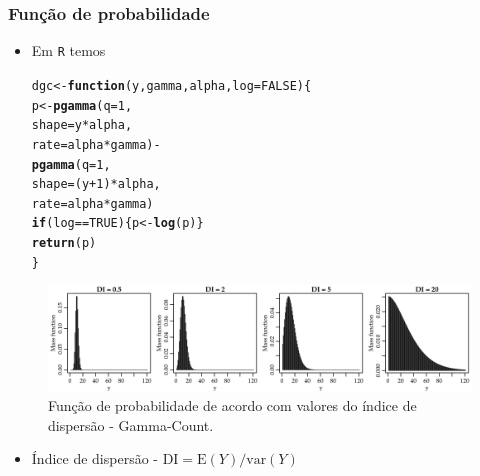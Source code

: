 \documentclass[10pt, aspectratio=169]{beamer}\usepackage[]{graphicx}\usepackage[]{color}
\makeatletter
\newcommand{\hlnum}[1]{\textcolor[rgb]{0.686,0.059,0.569}{#1}}%
\newcommand{\hlopt}[1]{\textcolor[rgb]{0,0,0}{#1}}%
\newcommand{\hlstd}[1]{\textcolor[rgb]{0.345,0.345,0.345}{#1}}%
\newcommand{\hlkwa}[1]{\textcolor[rgb]{0.161,0.373,0.58}{\textbf{#1}}}%
\newcommand{\hlkwb}[1]{\textcolor[rgb]{0.69,0.353,0.396}{#1}}%
\newcommand{\hlkwc}[1]{\textcolor[rgb]{0.333,0.667,0.333}{#1}}%
\newcommand{\hlkwd}[1]{\textcolor[rgb]{0.737,0.353,0.396}{\textbf{#1}}}%
\newenvironment{kframe}{%
 \def\at@end@of@kframe{}%
 \ifinner\ifhmode%
  \def\at@end@of@kframe{\end{minipage}}%
  \begin{minipage}{\columnwidth}%
 \fi\fi%
 \def\FrameCommand##1{\hskip\@totalleftmargin \hskip-\fboxsep
 \colorbox{shadecolor}{##1}\hskip-\fboxsep
     \hskip-\linewidth \hskip-\@totalleftmargin \hskip\columnwidth}%
 \MakeFramed {\advance\hsize-\width
   \@totalleftmargin\z@ \linewidth\hsize
   \@setminipage}}%
 {\par\unskip\endMakeFramed%
 \at@end@of@kframe}
\newenvironment{knitrout}{}{} %
\makeatother
\begin{document}
\begin{frame}[fragile]
  \frametitle{Função de probabilidade}
  \begin{itemize}
  \item Em \texttt{R} temos

\begin{knitrout}
\color{fgcolor}\begin{kframe}
\begin{alltt}
\hlstd{dgc} \hlkwb{<-} \hlkwa{function}\hlstd{(}\hlkwc{y}\hlstd{,} \hlkwc{gamma}\hlstd{,} \hlkwc{alpha}\hlstd{,} \hlkwc{log} \hlstd{=} \hlnum{FALSE}\hlstd{) \{}
  \hlstd{p} \hlkwb{<-} \hlkwd{pgamma}\hlstd{(}\hlkwc{q} \hlstd{=} \hlnum{1}\hlstd{,}
              \hlkwc{shape} \hlstd{= y} \hlopt{*} \hlstd{alpha,}
              \hlkwc{rate} \hlstd{= alpha} \hlopt{*} \hlstd{gamma)} \hlopt{-}
    \hlkwd{pgamma}\hlstd{(}\hlkwc{q} \hlstd{=} \hlnum{1}\hlstd{,}
           \hlkwc{shape} \hlstd{= (y} \hlopt{+} \hlnum{1}\hlstd{)} \hlopt{*} \hlstd{alpha,}
           \hlkwc{rate} \hlstd{= alpha} \hlopt{*} \hlstd{gamma)}
  \hlkwa{if}\hlstd{(log} \hlopt{==} \hlnum{TRUE}\hlstd{) \{p} \hlkwb{<-} \hlkwd{log}\hlstd{(p)\}}
  \hlkwd{return}\hlstd{(p)}
\hlstd{\}}
\end{alltt}
\end{kframe}
\end{knitrout}

\end{itemize}
\end{frame}

\begin{frame}[fragile]
\begin{figure}[h]
\includegraphics[scale=0.6]{images/GammaCount.png}
\caption{Função de probabilidade de acordo com valores do índice de dispersão - Gamma-Count.}
\label{Fig2}
\centering
\end{figure}
\begin{itemize}
\item Índice de dispersão - $\mathrm{DI} =  \mathrm{E}(Y)/\mathrm{var}(Y)$
\end{itemize}
\end{frame}
\end{document}

